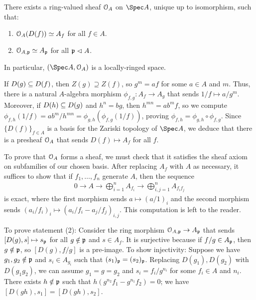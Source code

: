\documentclass[10pt,final,oneside]{amsbook}
\makeatletter
\renewenvironment{proof}[1][\proofname] 
{ 	
	\par\pushQED{\qed}\normalfont\topsep6\p@\@plus6\p@\relax\trivlist\itemindent\normalparindent
	\item[\hskip\labelsep\itshape#1\@addpunct{.}]\ignorespaces
}
{
	\popQED\endtrivlist\@endpefalse
}
\numberwithin{equation}{section}
\makeatother
\begin{document}
\begin{prop}
There exists a ring-valued sheaf $\cal{O}_A$ on $\Spec A$, unique up to isomorphism, such that:
\begin{enumerate}
\item 	$\cal{O}_A(D(f)) \simeq A_f$ for all $f \in A$.
\item 	$\cal{O}_{A, \fr{p}} \simeq A_\fr{p}$ for all $\fr{p} \normal A$.
\end{enumerate}
In particular, $(\Spec A, \cal{O}_A)$ is a locally-ringed space.
\end{prop}

\begin{proof}
If $D(g) \subeq D(f)$, then $Z(g) \supseteq Z(f)$, so $g^m = af$ for some $a \in A$ and $m$.
Thus, there is a natural $A$-algebra morphism $\phi_{f,g} : A_f \to A_g$ that sends $1/f \mapsto a/g^m$.
Moreover, if $D(h) \subeq D(g)$ and $h^n = bg$, then $h^{mn} = ab^mf$, so we compute $\phi_{f,h}(1/f) = ab^m/h^{mn} = \phi_{g,h}(\phi_{f,g}(1/f))$, proving $\phi_{f,h} = \phi_{g,h} \circ \phi_{f,g}$.
Since $\{D(f)\}_{f \in A}$ is a basis for the Zariski topology of $\Spec A$, we deduce that there is a presheaf $\cal{O}_A$ that sends $D(f) \mapsto A_f$ for all $f$.

To prove that $\cal{O}_A$ forms a sheaf, we must check that it satisfies the sheaf axiom on subfamilies of our chosen basis.
After replacing $A_f$ with $A$ as necessary, it suffices to show that if $f_1, \ldots, f_n$ generate $A$, then the sequence
\begin{align}
0 \to A \to \bigoplus_{i = 1}^n A_{f_i} \to \bigoplus_{i,j = 1}^n A_{f_if_j}
\end{align}
is exact, where the first morphism sends $a \mapsto (a/1)_i$ and the second morphism sends $(a_i/f_i)_i \mapsto (a_i/f_i - a_j/f_j)_{i,j}$.
This computation is left to the reader.

To prove statement (2):
Consider the ring morphism $\cal{O}_{A, \fr{p}} \to A_\fr{p}$ that sends $[D(g), s] \mapsto s_\fr{p}$ for all $g \notin \fr{p}$ and $s \in A_f$.
It is surjective because if $f/g \in A_\fr{p}$, then $g \notin \fr{p}$, so $[D(g), f/g]$ is a pre-image.
To show injectivity:
Suppose we have $g_1, g_2 \notin \fr{p}$ and $s_i \in A_{g_i}$ such that $(s_1)_\fr{p} = (s_2)_\fr{p}$.
Replacing $D(g_1), D(g_2)$ with $D(g_1g_2)$, we can assume $g_1 = g = g_2$ and $s_i = f_i/g^{n_i}$ for some $f_i \in A$ and $n_i$.
There exists $h \notin \fr{p}$ such that $h(g^{n_2}f_1 - g^{n_1}f_2) = 0$; we have $[D(gh), s_1] = [D(gh), s_2]$.
\end{proof}
\end{document}
